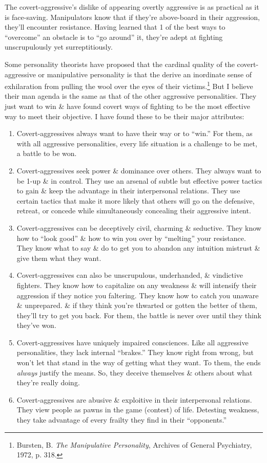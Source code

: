 \documentclass{article}
\numberwithin{equation}{section}
\begin{document}
The covert-aggressive's dislike of appearing overtly aggressive is as practical as it is face-saving. Manipulators know that if they're above-board in their aggression, they'll encounter resistance. Having learned that 1 of the best ways to ``overcome'' an obstacle is to ``go around'' it, they're adept at fighting unscrupulously yet surreptitiously.

Some personality theorists have proposed that the cardinal quality of the covert-aggressive or manipulative personality is that the derive an inordinate sense of exhilaration from pulling the wool over the eyes of their victims.\footnote{Bursten, B. \textit{The Manipulative Personality}, Archives of General Psychiatry, 1972, p. 318.} But I believe their man agenda is the same as that of the other aggressive personalities. They just want to win \& have found covert ways of fighting to be the most effective way to meet their objective. I have found these to be their major attributes:
\begin{enumerate}
	\item Covert-aggressives always want to have their way or to ``win.'' For them, as with all aggressive personalities, every life situation is a challenge to be met, a battle to be won.
	\item Covert-aggressives seek power \& dominance over others. They always want to be 1-up \& in control. They use an arsenal of subtle but effective power tactics to gain \& keep the advantage in their interpersonal relations. They use certain tactics that make it more likely that others will go on the defensive, retreat, or concede while simultaneously concealing their aggressive intent.
	\item Covert-aggressives can be deceptively civil, charming \& seductive. They know how to ``look good'' \& how to win you over by ``melting'' your resistance. They know what to say \& do to get you to abandon any intuition mistrust \& give them what they want.
	\item Covert-aggressives can also be unscrupulous, underhanded, \& vindictive fighters. They know how to capitalize on any weakness \& will intensify their aggression if they notice you faltering. They know how to catch you unaware \& unprepared. \& if they think you're thwarted or gotten the better of them, they'll try to get you back. For them, the battle is never over until they think they've won.
	\item Covert-aggressives have uniquely impaired consciences. Like all aggressive personalities, they lack internal ``brakes.'' They know right from wrong, but won't let that stand in the way of getting what they want. To them, the ends \textit{always} justify the means. So, they deceive themselves \& others about what they're really doing.
	\item Covert-aggressives are abusive \& exploitive in their interpersonal relations. They view people as pawns in the game (contest) of life. Detesting weakness, they take advantage of every frailty they find in their ``opponents.'' 
\end{enumerate}
\end{document}
